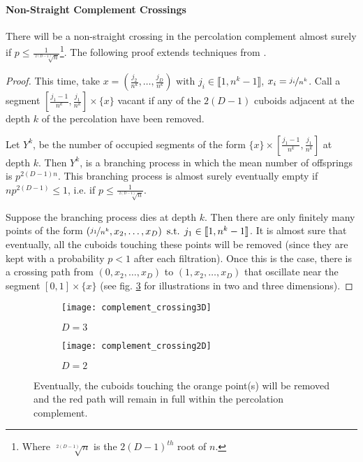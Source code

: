 \paragraph{Non-Straight Complement Crossings}
There will be a non-straight crossing in the percolation complement almost surely if $p \leq \frac{1}{\sqrt[2(D-1)]{n}}$\footnote{Where $\sqrt[2(D-1)]{n}$ is the $2(D-1)^{th}$ root of $n$.}.
The following proof extends techniques from \cite[p.310 b.(2)]{Chayes_1988}.
\begin{proof}\label{prf:nonStraightComplementCrossigs}
	This time, take $x = \left( \frac{j_2}{n^k},\dots,\frac{j_D}{n^k} \right) \text{ with } j_i \in \llbracket 1,n^k-1 \rrbracket$, $x_i = \nicefrac{j_i}{n^k}$.
	Call a segment $\left[ \frac{j_1-1}{n^k},\frac{j_1}{n^k} \right] \times \{ x \}$ vacant if any of the $2(D-1)$ cuboids adjacent at the depth $k$ of the percolation have been removed.
	
	Let $Y^k$, be the number of occupied segments of the form $\{ x \} \times \left[ \frac{j_1-1}{n^k},\frac{j_1}{n^k} \right]$ at depth $k$.
	Then $Y^k$, is a branching process in which the mean number of offsprings is $p^{2(D-1)n}$.
	This branching process is almost surely eventually empty if $np^{2(D-1)} \leq 1$, i.e. if $p \leq \frac{1}{\sqrt[2(D-1)]{n}}$.
	
	Suppose the branching process dies at depth $k$.
	Then there are only finitely many points of the form $\left( \nicefrac{j_1}{n^k}, x_2,\dots,x_D \right) \text{ s.t. } j_1 \in \llbracket 1,n^k-1 \rrbracket$.
	It is almost sure that eventually, all the cuboids touching these points will be removed (since they are kept with a probability $p<1$ after each filtration).
	Once this is the case, there is a crossing path from $\left( 0, x_2,\dots,x_D \right)$ to $\left( 1, x_2,\dots,x_D \right)$ that oscillate near the segment $\left[ 0,1 \right] \times \{ x \}$ (see fig. \ref{fig:complementCrossing} for illustrations in two and three dimensions).
\end{proof}

\begin{figure}[!h]
	\vspace{-0.75cm}
	\begin{subfigure}{0.44\linewidth}
		\texttt{[image: complement\_crossing3D]}
		\centering
		\captionsetup{justification=centering}
		\caption{$D = 3$}
		\label{fig:complementCrossing3D}
	\end{subfigure}
	\hspace{0.1\linewidth}
	\begin{subfigure}{0.44\linewidth}
		\texttt{[image: complement\_crossing2D]}
		\centering
		\captionsetup{justification=centering}
		\caption{$D = 2$}
		\label{fig:complementCrossing2D}
	\end{subfigure}
	\centering
	\caption{Eventually, the cuboids touching the orange point(s) will be removed and the red path will remain in full within the percolation complement.}
	\label{fig:complementCrossing}
\end{figure}

